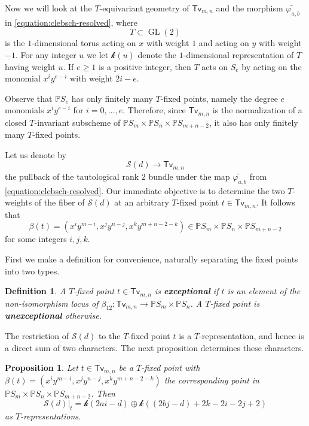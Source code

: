 \documentclass[reqno, 11pt]{amsart}
\theoremstyle{plain}
\newtheorem{proposition}[theorem]{Proposition}
\newtheorem{definition}[theorem]{Definition}
\theoremstyle{remark}
\renewcommand{\P}{\mathbb{P}}
\renewcommand{\k}{\mathscr{k}}
\renewcommand{\S}{\mathscr{S}}
\DeclareMathOperator{\GL}{GL}
\newcommand{\transvectant}{\mathsf{Tv}}
\begin{document}
Now we will look at the $T$-equivariant geometry of $\transvectant_{m,n}$ and the morphism $\widetilde{\varphi_{a,b}}$ in \eqref{equation:clebsch-resolved}, where $$T \subset \GL(2)$$ is the $1$-dimensional torus acting on $x$ with weight $1$ and acting on $y$ with weight $-1$. For any integer $u$ we let $\k(u)$ denote the $1$-dimensional representation of $T$ having weight $u$. If $e \geq 1$ is a positive integer, then $T$ acts on $S_e$ by acting on the monomial $x^iy^{e-i}$ with weight $2i-e$.

Observe that $\P S_{e}$ has only finitely many $T$-fixed points, namely the degree $e$ monomials $x^iy^{e-i}$ for $i = 0, \dots, e$. Therefore, since $\transvectant_{m,n}$ is the normalization of a closed $T$-invariant subscheme of $\P S_{m} \times \P S_{n} \times \P S_{m+n-2}$, it also has only finitely many $T$-fixed points. 

Let us denote by $$\S(d) \to \transvectant_{m,n}$$ the pullback of the tautological rank $2$ bundle under the map $\widetilde{\varphi_{a,b}}$ from \eqref{equation:clebsch-resolved}.  Our immediate objective is to determine the two $T$-weights of the fiber of $\S(d)$ at an arbitrary $T$-fixed point $t \in \transvectant_{m,n}$.  It follows that \[\beta(t) = (x^{i}y^{m-i}, x^{j}y^{n-j}, x^{k}y^{m+n-2-k}) \in \P S_{m} \times \P S_{n} \times \P S_{m+n-2}\] for some integers $i,j,k$. 

First we make a definition for convenience, naturally separating the fixed points into two types. 

\begin{definition}
    \label{definition:exceptionalfixedpoint} A $T$-fixed point $t \in \transvectant_{m,n}$ is \textbf{exceptional} if $t$ is an element of the non-isomorphism locus of $\beta_{12}: \transvectant_{m,n} \to \P S_{m} \times \P S_{n}$.  A $T$-fixed point is \textbf{unexceptional} otherwise.
\end{definition}

The restriction of $\S(d)$ to the $T$-fixed point $t$ is a $T$-representation, and hence is a direct sum of two characters.  The next proposition determines these characters. 

\begin{proposition}
\label{proposition:weightsofS}
Let $t \in \transvectant_{m,n}$ be a $T$-fixed point with $\beta(t) = (x^{i}y^{m-i}, x^{j}y^{n-j}, x^{k}y^{m+n-2-k})$ the corresponding point in $\P S_{m} \times \P S_{n} \times \P S_{m+n-2}$.  Then 
\[ \S(d)|_{t} = \k(2ai - d) \oplus \k((2bj - d) + 2k-2i-2j+2)\] as $T$-representations.
\end{proposition}
\end{document}
